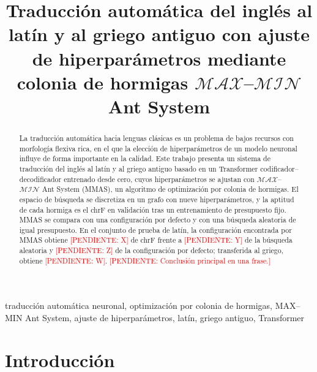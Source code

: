 \documentclass[conference]{IEEEtran}
\newcommand{\pendiente}[1]{\textcolor{red}{[PENDIENTE: #1]}}
\newcommand{\chrf}{chrF}
\newcommand{\mmas}{$\mathcal{MAX}$--$\mathcal{MIN}$ Ant System}
\begin{document}
\title{Traducción automática del inglés al latín y al griego antiguo con
ajuste de hiperparámetros mediante colonia de hormigas \mmas}

\author{
\IEEEauthorblockA{\pendiente{Departamento, Universidad}\\
\pendiente{Ciudad, País}\\
\pendiente{correos}}
}

\maketitle

\begin{abstract}
La traducción automática hacia lenguas clásicas es un problema de bajos
recursos con morfología flexiva rica, en el que la elección de
hiperparámetros de un modelo neuronal influye de forma importante en la
calidad. Este trabajo presenta un sistema de traducción del inglés al
latín y al griego antiguo basado en un Transformer codificador--decodificador
entrenado desde cero, cuyos hiperparámetros se ajustan con \mmas{} (MMAS),
un algoritmo de optimización por colonia de hormigas. El espacio de
búsqueda se discretiza en un grafo con nueve hiperparámetros, y la aptitud
de cada hormiga es el \chrf{} en validación tras un entrenamiento de
presupuesto fijo. MMAS se compara con una configuración por defecto y con
una búsqueda aleatoria de igual presupuesto. En el conjunto de prueba de
latín, la configuración encontrada por MMAS obtiene \pendiente{X} de
\chrf{} frente a \pendiente{Y} de la búsqueda aleatoria y \pendiente{Z}
de la configuración por defecto; transferida al griego, obtiene
\pendiente{W}. \pendiente{Conclusión principal en una frase.}
\end{abstract}

\begin{IEEEkeywords}
traducción automática neuronal, optimización por colonia de hormigas,
MAX--MIN Ant System, ajuste de hiperparámetros, latín, griego antiguo,
Transformer
\end{IEEEkeywords}

\section{Introducción}
\end{document}
